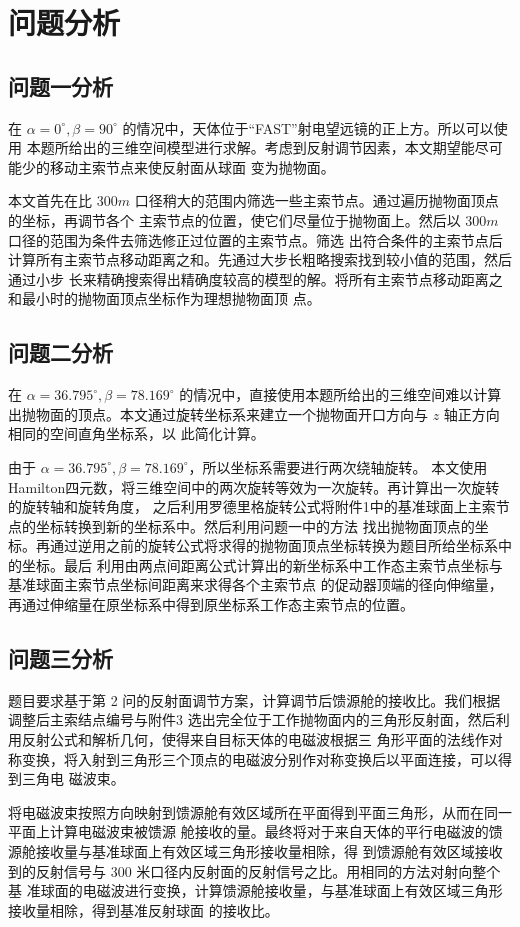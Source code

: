 \documentclass[withoutpreface,bwprint]{cumcmthesis} %
\begin{document}
\section{问题分析}
\subsection{问题一分析}
在 $\alpha = 0^\circ , \beta = 90^\circ$ 的情况中，天体位于“FAST”射电望远镜的正上方。所以可以使用
本题所给出的三维空间模型进行求解。考虑到反射调节因素，本文期望能尽可能少的移动主索节点来使反射面从球面
变为抛物面。

本文首先在比 $300m$ 口径稍大的范围内筛选一些主索节点。通过遍历抛物面顶点的坐标，再调节各个
主索节点的位置，使它们尽量位于抛物面上。然后以 $300m$ 口径的范围为条件去筛选修正过位置的主索节点。筛选
出符合条件的主索节点后计算所有主索节点移动距离之和。先通过大步长粗略搜索找到较小值的范围，然后通过小步
长来精确搜索得出精确度较高的模型的解。将所有主索节点移动距离之和最小时的抛物面顶点坐标作为理想抛物面顶
点。
\subsection{问题二分析}
在 $\alpha = 36.795^\circ , \beta = 78.169^\circ$ 的情况中，直接使用本题所给出的三维空间难以计算
出抛物面的顶点。本文通过旋转坐标系来建立一个抛物面开口方向与 $z$ 轴正方向相同的空间直角坐标系，以
此简化计算。

由于 $\alpha = 36.795^\circ , \beta = 78.169^\circ$，所以坐标系需要进行两次绕轴旋转。
本文使用Hamilton四元数，将三维空间中的两次旋转等效为一次旋转。再计算出一次旋转的旋转轴和旋转角度，
之后利用罗德里格旋转公式将附件1中的基准球面上主索节点的坐标转换到新的坐标系中。然后利用问题一中的方法
找出抛物面顶点的坐标。再通过逆用之前的旋转公式将求得的抛物面顶点坐标转换为题目所给坐标系中的坐标。最后
利用由两点间距离公式计算出的新坐标系中工作态主索节点坐标与基准球面主索节点坐标间距离来求得各个主索节点
的促动器顶端的径向伸缩量，再通过伸缩量在原坐标系中得到原坐标系工作态主索节点的位置。
\subsection{问题三分析}
题目要求基于第 2 问的反射面调节方案，计算调节后馈源舱的接收比。我们根据调整后主索结点编号与附件3
选出完全位于工作抛物面内的三角形反射面，然后利用反射公式和解析几何，使得来自目标天体的电磁波根据三
角形平面的法线作对称变换，将入射到三角形三个顶点的电磁波分别作对称变换后以平面连接，可以得到三角电
磁波束。

将电磁波束按照方向映射到馈源舱有效区域所在平面得到平面三角形，从而在同一平面上计算电磁波束被馈源
舱接收的量。最终将对于来自天体的平行电磁波的馈源舱接收量与基准球面上有效区域三角形接收量相除，得
到馈源舱有效区域接收到的反射信号与 $300$ 米口径内反射面的反射信号之比。用相同的方法对射向整个基
准球面的电磁波进行变换，计算馈源舱接收量，与基准球面上有效区域三角形接收量相除，得到基准反射球面
的接收比。
\end{document}
